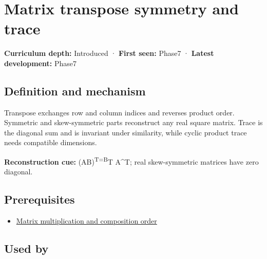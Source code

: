\hypertarget{appendix-175ca5ff874d}{}\label{referencestart:appendix-175ca5ff874d}
\section{Matrix transpose symmetry and trace}\label{appendix-175ca5ff874d-matrix-transpose-symmetry-and-trace}

\hypertarget{appendix-175ca5ff874d-matrix-transpose-symmetry-and-trace}{}

\textbf{Curriculum depth:} Introduced · \textbf{First seen:} Phase7 · \textbf{Latest development:} Phase7

\begin{allmightroledefinition}

\subsection{Definition and mechanism}\label{appendix-175ca5ff874d-definition-and-mechanism}

\hypertarget{appendix-175ca5ff874d-definition-and-mechanism}{}

Transpose exchanges row and column indices and reverses product order. Symmetric and skew-symmetric parts reconstruct any real square matrix. Trace is the diagonal sum and is invariant under similarity, while cyclic product trace needs compatible dimensions.

\end{allmightroledefinition}

\textbf{Reconstruction cue:} (AB)\textsuperscript{T=B}T A\^{}T; real skew-symmetric matrices have zero diagonal.

\subsection{Prerequisites}\label{appendix-175ca5ff874d-prerequisites}

\hypertarget{appendix-175ca5ff874d-prerequisites}{}

\begin{itemize}
\tightlist
\item
  \hyperref[appendix-ab31ef447dbf]{Matrix multiplication and composition order}
\end{itemize}

\subsection{Used by}\label{appendix-175ca5ff874d-used-by}

